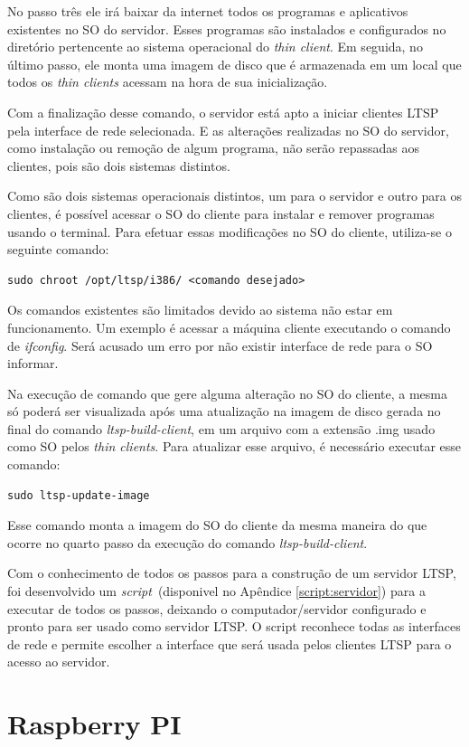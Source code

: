 \documentclass[
	12pt,				%
	openright,			%
	twoside,			%
	a4paper,			%
	chapter=TITLE,		%
	english,			%
	brazil				%
	]{abntex2}
\begin{document}
No passo três ele irá baixar da internet todos os programas e aplicativos existentes no SO do servidor. Esses programas são instalados e configurados no diretório pertencente ao sistema operacional do \textit{thin client}.  Em seguida, no último passo, ele monta uma imagem de disco que é armazenada em um local que todos os \textit{thin clients} acessam na hora de sua inicialização.

Com a finalização desse comando, o servidor está apto a iniciar clientes LTSP pela interface de rede selecionada. E as alterações realizadas no SO do servidor, como instalação ou remoção de algum programa, não serão repassadas aos clientes, pois são dois sistemas distintos.

Como são dois sistemas operacionais distintos, um para o servidor e outro para os clientes, é possível acessar o SO do cliente para instalar e remover programas usando o terminal. Para efetuar essas modificações no SO do cliente, utiliza-se o seguinte comando:
\begin{verbatim}
sudo chroot /opt/ltsp/i386/ <comando desejado>
\end{verbatim}
Os comandos existentes são limitados devido ao sistema não estar em funcionamento. Um exemplo é acessar a máquina cliente executando o comando de \textit{ifconfig}. Será acusado um erro por não existir interface de rede para o SO informar.

Na execução de comando que gere alguma alteração no SO do cliente, a mesma só poderá ser visualizada após uma atualização na imagem de disco gerada no final do comando \textit{ltsp-build-client}, em um arquivo com a extensão .img usado como SO pelos \textit{thin clients}. Para atualizar esse arquivo, é necessário executar esse comando:
\begin{verbatim}
sudo ltsp-update-image
\end{verbatim}
Esse comando monta a imagem do SO do cliente da mesma maneira do que ocorre no quarto passo da execução do comando  \textit{ltsp-build-client}.

Com o conhecimento de todos os passos para a construção de um servidor LTSP, foi desenvolvido um \textit{script}\ (disponivel no Apêndice \ref{script:servidor}) para a executar de todos os passos, deixando o computador/servidor configurado e pronto para ser usado como servidor LTSP. O script reconhece todas as interfaces de rede e permite escolher a interface que será usada pelos clientes LTSP para o acesso ao servidor. 

\chapter{Raspberry PI}
\label{confRasp}
\end{document}
